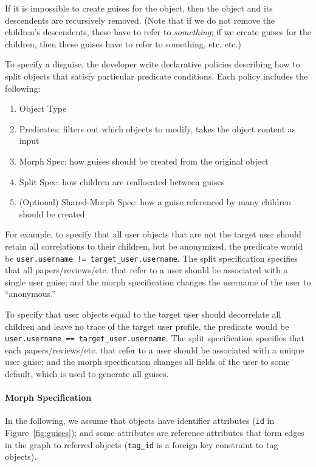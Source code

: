 If it is impossible to create guises for the object, then the object
and its descendents are recursively removed. (Note that if we do not remove the children's
descendents, these have to refer to \emph{something}; if we create guises for the children, then
these guises have to refer to something, etc. etc.)

To specify a disguise, the developer write declarative policies describing how to split objects that
satisfy particular predicate conditions. Each policy includes the following:
\begin{enumerate}
    \item Object Type
    \item Predicates: filters out which objects to modify, takes the object content as input
    \item Morph Spec: how guises should be created from the original object
    \item Split Spec: how children are reallocated between guises
    \item (Optional) Shared-Morph Spec: how a guise referenced by many children should be created
\end{enumerate}

For example, to specify that all user objects that are not the target user should retain all correlations to
their children, but be anonymized, the predicate would be \texttt{user.username !=
target\_user.username}.
The split specification specifies that all papers/reviews/etc. that refer to a user should be
associated with a single user guise; and the morph specification changes the username of the user to
``anonymous.''

To specify that user objects equal to the target user should decorrelate all children and leave no
trace of the target user profile, the predicate would be \texttt{user.username ==
target\_user.username}.
The split specification specifies that each papers/reviews/etc. that refer to a user should be
associated with a unique user guise; and the morph specification changes all fields of the user to
some default, which is used to generate all guises.

\paragraph{Morph Specification}
In the following, we assume that objects have identifier attributes (\eg \texttt{id} in
Figure~\ref{fig:guises}); and some attributes are reference attributes that form edges in the graph
to referred objects (\eg \texttt{tag\_id} is a foreign key constraint to tag objects).

